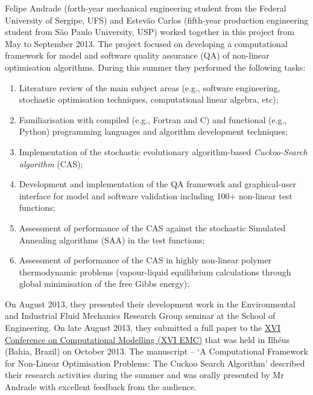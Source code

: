 \documentclass[14pt,twoside]{report}
\begin{document}
Felipe Andrade (forth-year mechanical engineering student from the Federal University of Sergipe, UFS) and Estev\~ao Carlos (fifth-year production engineering student from S\~ao Paulo University, USP) worked together in this project from May to September 2013. The project focused on developing a computational framework for model and software quality assurance (QA) of non-linear optimisation algorithms. During this summer they performed the following tasks: 
\begin{enumerate}
\item Literature review of the main subject areas (e.g., software engineering, stochastic optimisation techniques, computational linear algebra, etc);
\item Familiarisation with compiled (e.g., Fortran and C) and functional (e.g., Python) programming languages and algorithm development techniques;
\item Implementation of the stochastic evolutionary algorithm-based {\it Cuckoo-Search algorithm} (CAS);
\item Development and implementation of the QA framework and graphical-user interface for model and software validation including 100+ non-linear test functions;
\item Assessment of performance of the CAS against the stochastic Simulated Annealing algorithms (SAA) in the test functions;
\item Assessment of performance of the CAS in highly non-linear polymer thermodynamic problems (vapour-liquid equilibrium calculations through global minimisation of the free Gibbs energy);
\end{enumerate}


On August 2013, they presented their development work in the Environmental and Industrial Fluid Mechanics Research Group seminar at the School of Engineering. On late August 2013, they submitted a full paper to the \href{http://nbcgib.uesc.br/emc2013/}{XVI Conference on Computational Modelling (XVI EMC)} that was held in Ilh\'eus (Bahia, Brazil) on October 2013. The manuscript -- `A Computational Framework for Non-Linear Optimisation Problems: The Cuckoo Search Algorithm' described their research activities during the summer and was orally presented by Mr Andrade with excellent feedback from the audience. 
\end{document}
